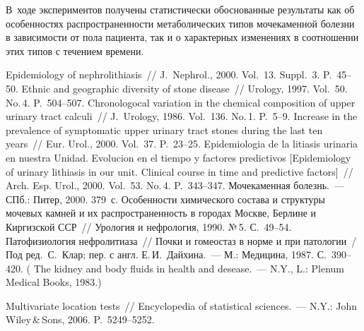 \begin{multicols}{2}
В~ходе экспериментов получены статистически обоснованные 
результаты как об особенностях распространенности метаболических типов 
мочекаменной болезни в зависимости от пола пациента, так 
и о характерных изменениях в соотношении этих типов с течением времени.

\vspace*{-6pt}

{\small\frenchspacing
{%
\begin{thebibliography}{99}

\vspace*{-2pt}

   Epidemiology of nephrolithiasis~// J.~Nephrol., 
2000. Vol.~13. Suppl.~3. P.~45--50.
 Ethnic and geographic diversity of stone 
disease~// Urology, 1997. Vol.~50. No.\,4. P.~504--507.
   Chronologocal variation in the chemical composition of upper urinary tract 
calculi~// J.~Urology, 1986. Vol.~136. No.\,1. P.~5--9.
   Increase in 
the prevalence of symptomatic upper urinary tract stones during the last ten years~// Eur. Urol., 
2000. Vol.~37. P.~23--25.
   Epidemiologia de la litiasis urinaria en nuestra Unidad. Evolucion en 
el tiempo y factores predictivos [Epidemiology of urinary lithiasis in our unit. Clinical course in 
time and predictive factors]~// Arch. Esp. Urol., 2000. Vol.~53. No.\,4. P.~343--347.
   Мочекаменная болезнь.~--- СПб.: Питер, 
2000. 379~с.
Особенности химического состава и структуры мочевых камней и их распространенность в 
городах Москве, Берлине и Киргизской ССР~// Урология и нефрология, 1990. №\,5. С.~49--54.
   Патофизиология нефролитиаза~// Почки и гомеостаз в норме 
и при патологии~/ Под ред.\ С.~Клар; пер. с англ. Е.\,И.~Дайхина.~--- 
М.: Медицина, 1987. С.~390--420. ( The kidney and body fluids in health and
desease.~--- N.Y., L.: Plenum Medical Books, 1983.)

   Multivariate location tests~// Encyclopedia of statistical 
  sciences.~--- N.Y.: John Wiley\,\&\,Sons, 2006. P.~5249--5252.
  

\end{thebibliography}}}
\end{multicols}
